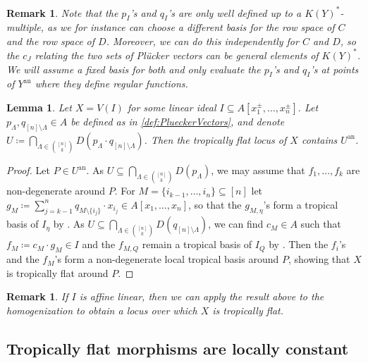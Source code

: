 \documentclass[12pt,reqno,a4paper]{amsart}
\theoremstyle{theoremstyle}
\newtheorem{lemma}[theorem]{Lemma}
\theoremstyle{examplestyle}
\newtheorem{remark}[theorem]{Remark}
\theoremstyle{algorithmstyle}
\newcommand{\an}{{\mathrm{an}}}
\begin{document}
\begin{remark}
Note that the $p_{I}$'s and $q_{I}$'s are only well defined up to a $K(Y)^{*}$-multiple, as we for instance can choose a different basis for the row space of $C$ and the row space of $D$. Moreover, we can do this independently for $C$ and $D$, so the $c_{J}$ relating the two sets of Pl\"{u}cker vectors can be general elements of $K(Y)^{*}$.  We will assume a fixed basis for both and only evaluate the $p_{I}$'s and $q_{I}$'s at points of $Y^{\an}$ where they define regular functions.
\end{remark}

\begin{lemma}\label{lem:FlatnessMatroids}
  Let $X=V(I)$ for some linear ideal $I\subseteq A[x_{1}^{\pm},\dots,x_{n}^{\pm}]$.  Let $p_{\Lambda},q_{[n]\setminus\Lambda}\in A$ be defined as in \cref{def:PlueckerVectors}, and denote $U\coloneqq \bigcap_{\Lambda\in\binom{[n]}{k}}D(p_\Lambda\cdot q_{[n]\setminus\Lambda})$. Then the tropically flat locus of $X$ contains $U^{\an}$.
\end{lemma}
\begin{proof}
  Let $P\in U^{\an}$.  As $U\subseteq \bigcap_{\Lambda\in\binom{[n]}{k}}D(p_\Lambda)$, we may assume that $f_1,\dots,f_k$ are non-degenerate around $P$.
  For $M=\{i_{k-1},\dots,i_{n}\}\subseteq [n]$ let $g_{M}\coloneqq \sum_{j=k-1}^n q_{M\setminus \{i_j\}} \cdot x_{i_j}\in A[x_1,\dots,x_n]$, so that the $g_{M,\eta}$'s form a tropical basis of $I_\eta$ by \cite[Lemma 4.3.16]{MS15}.  As $U\subseteq \bigcap_{\Lambda\in\binom{[n]}{k}}D(q_{[n]\setminus\Lambda})$, we can find $c_M\in A$ such that $f_M\coloneqq c_M\cdot g_M\in I$ and the $f_{M,Q}$ remain a tropical basis of $I_Q$ by \cite[Lemma 4.3.16]{MS15}. Then the $f_i$'s and the $f_M$'s form a non-degenerate local tropical basis around $P$, showing that $X$ is tropically flat around $P$.
\end{proof}
%
%
%

\begin{remark}
  If $I$ is affine linear, then we can apply the result above to the homogenization to obtain a locus over which $X$ is tropically flat.
\end{remark}
%
%
%
%



\subsection{Tropically flat morphisms are locally constant}\label{sec:GenericTropicalFlatness}
\end{document}

